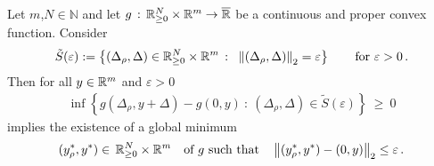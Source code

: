 \begin{lemma}
  Let $m$,$N\in\mathbb{N}$ and let 
  $
  g \,:\, \mathbb{R}^N_{\ge 0}\times\mathbb{R}^m \to \overline{\mathbb{R}}
  $ 
  be a continuous and proper convex function.
  Consider 
  \begin{gather*}
    \tilde{S}(\varepsilon)
    :=
    \left\{ 
      (\Delta_\rho,\Delta)
      \in
      \R^N_{\ge 0}\times\R^m
      \ 
      \colon
      \ 
      \norm{
      (\Delta_\rho,\Delta)
      }_2
      =
      \varepsilon
    \right\}
    \qquad
    \text{for}
    \ 
    \varepsilon>0
    \,.
  \end{gather*}
Then 
  for all $y \in \mathbb{R}^m$ and $\varepsilon>0$ 
    \begin{gather}
      \label{696}
      \inf 
      \left\{ 
        g(\Delta_\rho,y+\Delta)
        -
        g(0,y)
      \ 
        \colon
      \ 
      (\Delta_\rho,\Delta)
      \in
    \tilde{S}(\varepsilon)
      \right\}
      \ 
      \ge
      \ 
      0
    \end{gather}
    implies
    the existence of  
    a global minimum
    \begin{gather*}
    (y^*_\rho,y^*)
    \in \,\mathbb{R}^N_{\ge 0}\times\mathbb{R}^m
    \quad
    \text{of $g$ such that}\quad
      \left\lVert
    (y^*_\rho,y^*)
      - (0,y)\right\rVert_2 \le \varepsilon
      \,.
    \end{gather*}
\end{lemma}
